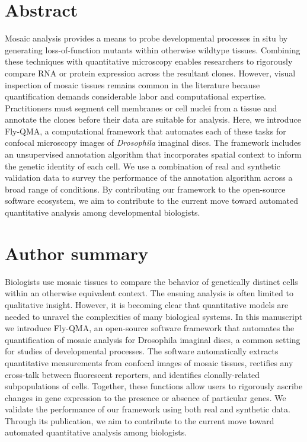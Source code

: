 \documentclass[10pt,letterpaper]{article}
\begin{document}
\pagebreak


\section*{Abstract}
Mosaic analysis provides a means to probe developmental processes in situ by generating loss-of-function mutants within otherwise wildtype tissues. Combining these techniques with quantitative microscopy enables researchers to rigorously compare RNA or protein expression across the resultant clones. However, visual inspection of mosaic tissues remains common in the literature because quantification demands considerable labor and computational expertise. Practitioners must segment cell membranes or cell nuclei from a tissue and annotate the clones before their data are suitable for analysis. Here, we introduce Fly-QMA, a computational framework that automates each of these tasks for confocal microscopy images of \textit{Drosophila} imaginal discs. The framework includes an unsupervised annotation algorithm that incorporates spatial context to inform the genetic identity of each cell. We use a combination of real and synthetic validation data to survey the performance of the annotation algorithm across a broad range of conditions. By contributing our framework to the open-source software ecosystem, we aim to contribute to the current move toward automated quantitative analysis among developmental biologists.


\section*{Author summary}
Biologists use mosaic tissues to compare the behavior of genetically distinct cells within an otherwise equivalent context. The ensuing analysis is often limited to qualitative insight. However, it is becoming clear that quantitative models are needed to unravel the complexities of many biological systems. In this manuscript we introduce Fly-QMA, an open-source software framework that automates the quantification of mosaic analysis for Drosophila imaginal discs, a common setting for studies of developmental processes. The software automatically extracts quantitative measurements from confocal images of mosaic tissues, rectifies any cross-talk between fluorescent reporters, and identifies clonally-related subpopulations of cells. Together, these functions allow users to rigorously ascribe changes in gene expression to the presence or absence of particular genes. We validate the performance of our framework using both real and synthetic data. Through its publication, we aim to contribute to the current move toward automated quantitative analysis among biologists.
\end{document}
